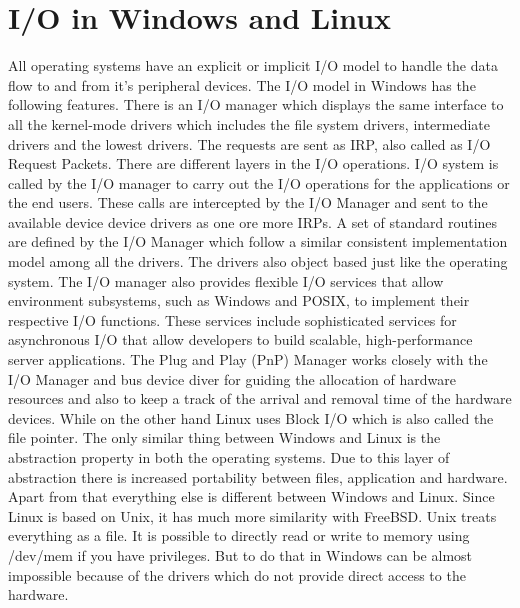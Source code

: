 \documentclass[letterpaper,10pt,titlepage]{IEEEtran}
\begin{document}
\section*{I/O in Windows and Linux}
All operating systems have an explicit or implicit I/O model to handle the data flow to and from it's peripheral devices. The I/O model in Windows has the following features. There is an I/O manager which displays the same interface to all the kernel-mode drivers which includes the file system drivers, intermediate drivers and the lowest drivers. The requests are sent as IRP, also called as I/O Request Packets. There are different layers in the I/O operations. I/O system is called by the I/O manager to carry out the I/O operations for the applications or the end users. These calls are intercepted by the I/O Manager and sent to the available device device drivers as one ore more IRPs. A set of standard routines are defined by the I/O Manager which follow a similar consistent implementation model among all the drivers. The drivers also object based just like the operating system. The I/O manager also provides flexible I/O services that allow environment subsystems, such as Windows and POSIX, to implement their respective I/O functions. These services include sophisticated services for asynchronous I/O that allow developers to build scalable, high-performance server applications. The Plug and Play (PnP) Manager works closely with the I/O Manager and bus device diver for guiding the allocation of hardware resources and also to keep a track of the arrival and removal time of the hardware devices. While on the other hand Linux uses Block I/O which is also called the file pointer. The only similar thing between Windows and Linux is the abstraction property in both the operating systems. Due to this layer of abstraction there is increased portability between files, application and hardware. Apart from that everything else is different between Windows and Linux. Since Linux is based on Unix, it has much more similarity with FreeBSD. Unix treats everything as a file. It is possible to directly read or write to memory using /dev/mem if you have privileges. But to do that in Windows can be almost impossible because of the drivers which do not provide direct access to the hardware. 
\end{document}
